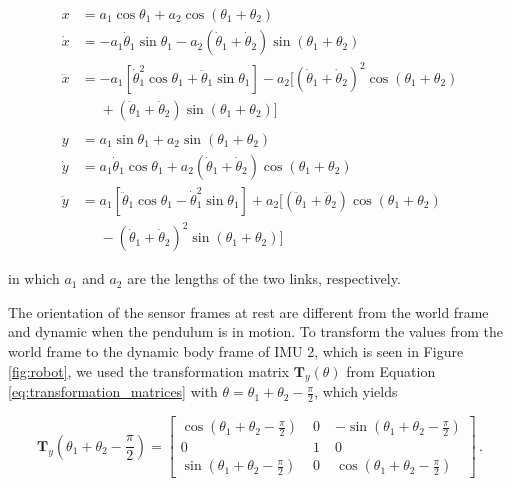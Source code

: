 \begin{align}
  x &= a_1 \cos \theta_1 + a_2 \cos(\theta_1 + \theta_2) \\
  \dot{x} &= -a_1 \dot{\theta}_1 \sin \theta_1  - a_2 (\dot{\theta}_1 + \dot{\theta}_2) \sin(\theta_1 + \theta_2) \\
  \ddot{x} {}&= -a_1 [\dot{\theta}^2_1 \cos \theta_1 + \ddot{\theta}_1 \sin \theta_1] - a_2 [(\dot{\theta}_1 + \dot{\theta}_2)^2 \cos(\theta_1 + \theta_2) \nonumber \\ 
  &\mathrel{\phantom{=}} + (\ddot{\theta}_1 + \ddot{\theta}_2) \sin(\theta_1 + \theta_2)] \label{eq:acc_x} \\
  \nonumber \\
  y &= a_1 \sin \theta_1 + a_2 \sin(\theta_1 + \theta_2) \\
  \dot{y} &= a_1 \dot{\theta}_1 \cos \theta_1  + a_2 (\dot{\theta}_1 + \dot{\theta}_2) \cos(\theta_1 + \theta_2) \\
  \ddot{y} {}&= a_1 [\ddot{\theta}_1 \cos \theta_1 - \dot{\theta}^2_1 \sin \theta_1] + a_2 [(\ddot{\theta}_1 + \ddot{\theta}_2) \cos(\theta_1 + \theta_2) \nonumber \\ 
  &\mathrel{\phantom{=}} - (\dot{\theta}_1 + \dot{\theta}_2)^2 \sin(\theta_1 + \theta_2)] \label{eq:acc_y}
\end{align}

\noindent
in which $a_1$ and $a_2$ are the lengths of the two links, respectively.

The orientation of the sensor frames at rest are different from the world frame and dynamic when the pendulum is in motion. To transform the values from the world frame to the dynamic body frame of \gls{IMU} 2, which is seen in Figure \ref{fig:robot}, we used the transformation matrix $\mathbf{T}_y(\theta)$ from Equation \ref{eq:transformation_matrices} with $\theta = \theta_1 + \theta_2 - \frac{\pi}{2}$, which yields

\begin{equation}
\mathbf{T}_y(\theta_1 + \theta_2 - \frac{\pi}{2}) = \begin{bmatrix}
    \cos (\theta_1 + \theta_2 - \frac{\pi}{2}) \; & 0 \; & -\sin (\theta_1 + \theta_2 - \frac{\pi}{2}) \\
    0 \; & 1 \; & 0 \\
    \sin (\theta_1 + \theta_2 - \frac{\pi}{2}) \; & 0 \; & \cos (\theta_1 + \theta_2 - \frac{\pi}{2})
    \end{bmatrix}\,.
\end{equation}

